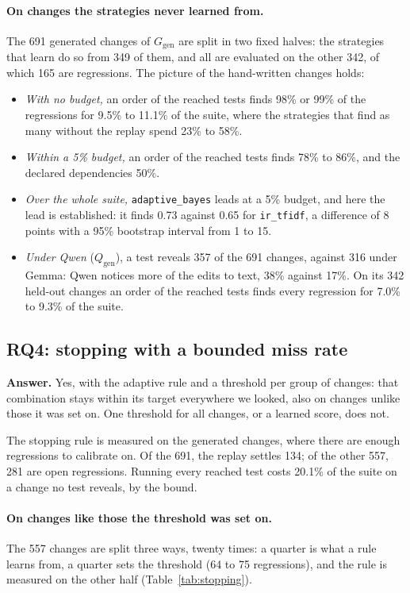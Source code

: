 \documentclass[11pt,a4paper]{article}
\newcommand{\strat}[1]{\texttt{#1}}
\newcommand{\answer}[1]{\noindent\textbf{Answer.} #1\par\smallskip}
\begin{document}
\paragraph{On changes the strategies never learned from.} The 691 generated changes of $G_{\mathrm{gen}}$ are split
in two fixed halves: the strategies that learn do so from 349 of them, and all are evaluated on the other 342, of
which 165 are regressions. The picture of the hand-written changes holds:
\begin{itemize}
  \item \emph{With no budget,} an order of the reached tests finds 98\% or 99\% of the regressions for 9.5\% to
        11.1\% of the suite, where the strategies that find as many without the replay spend 23\% to 58\%.
  \item \emph{Within a 5\% budget,} an order of the reached tests finds 78\% to 86\%, and the declared
        dependencies 50\%.
  \item \emph{Over the whole suite,} \strat{adaptive\_bayes} leads at a 5\% budget, and here the lead is
        established: it finds 0.73 against 0.65 for \strat{ir\_tfidf}, a difference of 8 points with a 95\%
        bootstrap interval from 1 to 15.
  \item \emph{Under Qwen} ($Q_{\mathrm{gen}}$), a test reveals 357 of the 691 changes, against 316 under Gemma:
        Qwen notices more of the edits to text, 38\% against 17\%. On its 342 held-out changes an order of the
        reached tests finds every regression for 7.0\% to 9.3\% of the suite.
\end{itemize}

\subsection{RQ4: stopping with a bounded miss rate}

\answer{Yes, with the adaptive rule and a threshold per group of changes: that combination stays within its
target everywhere we looked, also on changes unlike those it was set on. One threshold for all changes, or a
learned score, does not.}

The stopping rule is measured on the generated changes, where there are enough regressions to calibrate on. Of
the 691, the replay settles 134; of the other 557, 281 are open regressions. Running every reached test costs
20.1\% of the suite on a change no test reveals, by the bound.

\paragraph{On changes like those the threshold was set on.} The 557 changes are split three ways, twenty times:
a quarter is what a rule learns from, a quarter sets the threshold (64 to 75 regressions), and the rule is
measured on the other half (Table~\ref{tab:stopping}).
\end{document}
